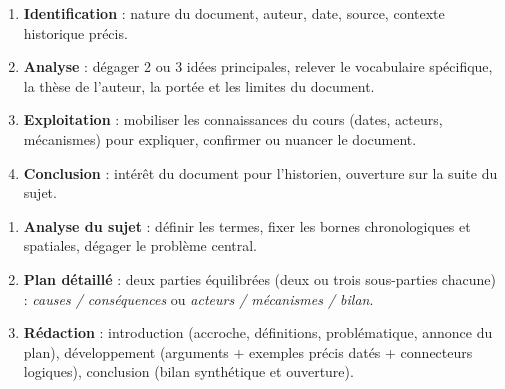 \documentclass[11pt]{article}
\begin{document}
\begin{methode}
\begin{enumerate}
    \item \textbf{Identification} : nature du document, auteur, date, source, contexte historique précis.
    \item \textbf{Analyse} : dégager 2 ou 3 idées principales, relever le vocabulaire spécifique, la thèse de l'auteur, la portée et les limites du document.
    \item \textbf{Exploitation} : mobiliser les connaissances du cours (dates, acteurs, mécanismes) pour expliquer, confirmer ou nuancer le document.
    \item \textbf{Conclusion} : intérêt du document pour l'historien, ouverture sur la suite du sujet.
\end{enumerate}
\end{methode}

\begin{methode}
\begin{enumerate}
    \item \textbf{Analyse du sujet} : définir les termes, fixer les bornes chronologiques et spatiales, dégager le problème central.
    \item \textbf{Plan détaillé} : deux parties équilibrées (deux ou trois sous-parties chacune) : \emph{causes / conséquences} ou \emph{acteurs / mécanismes / bilan}.
    \item \textbf{Rédaction} : introduction (accroche, définitions, problématique, annonce du plan), développement (arguments + exemples précis datés + connecteurs logiques), conclusion (bilan synthétique et ouverture).
\end{enumerate}
\end{methode}
\end{document}
